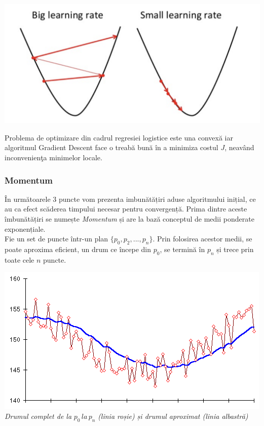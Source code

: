 \begin{center}
\includegraphics[scale=0.2]{gradientDescentLearningRate}
\end{center} 

Problema de optimizare din cadrul regresiei logistice este una convexă iar algoritmul Gradient Descent face o treabă bună în a minimiza costul $J$, neavând inconvenienţa minimelor locale. 

\subsubsection{Momentum}
În următoarele 3 puncte vom prezenta imbunătățiri aduse algoritmului inițial, ce au ca efect scăderea timpului necesar pentru convergență. Prima dintre aceste îmbunătățiri se numește  \textit{Momentum} și are la bază conceptul de medii ponderate exponențiale. \\

Fie un set de puncte într-un plan $\{p_0, p_2, ..., p_n\}$. Prin folosirea acestor medii, se poate aproxima eficient, un drum ce începe din $p_0$, se termină în $p_n$ și trece prin toate cele $n$ puncte.
\begin{center}
\includegraphics[scale=0.7]{expWeightedAvg} \\
\textit{Drumul complet de la } $p_0 \, la \, p_n $ \textit{(linia roșie) și drumul aproximat (linia albastră)}
\end{center}

